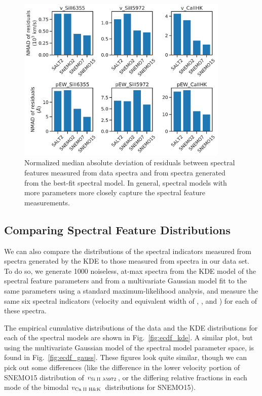 \begin{figure}
    \centering
    \includegraphics[width=0.9\textwidth]{figures/snemo_kde/model_spec_feat_recovery.pdf}
    \caption{Normalized median absolute deviation of residuals between spectral features measured from data spectra and from spectra generated from the best-fit spectral model. In general, spectral models with more parameters more closely capture the spectral feature measurements.}
    \label{fig:model_spec_feat_recovery}
\end{figure}

\subsection{Comparing Spectral Feature Distributions}
We can also compare the distributions of the spectral indicators measured from spectra generated by the KDE to those measured from spectra in our data set. To do so, we generate 1000 noiseless, at-max spectra from the KDE model of the spectral feature parameters and from a multivariate Gaussian model fit to the same parameters using a standard maximum-likelihood analysis, and measure the same six spectral indicators (velocity and equivalent width of \SiIIred, \SiIIblue, and \CaIIHK{}) for each of these spectra.

The empirical cumulative distributions of the data and the KDE distributions for each of the spectral models are shown in Fig.~\ref{fig:ecdf_kde}. A similar plot, but using the multivariate Gaussian model of the spectral model parameter space, is found in Fig.~\ref{fig:ecdf_gauss}. These figures look quite similar, though we can pick out some differences (like the difference in the lower velocity portion of SNEMO15 distribution of $v_\text{Si$\;${\scshape{II}} $\lambda$5972}$, or the differing relative fractions in each mode of the bimodal $v_\text{Ca$\;${\scshape{II}} H\&K{}}$ distributions for SNEMO15).

